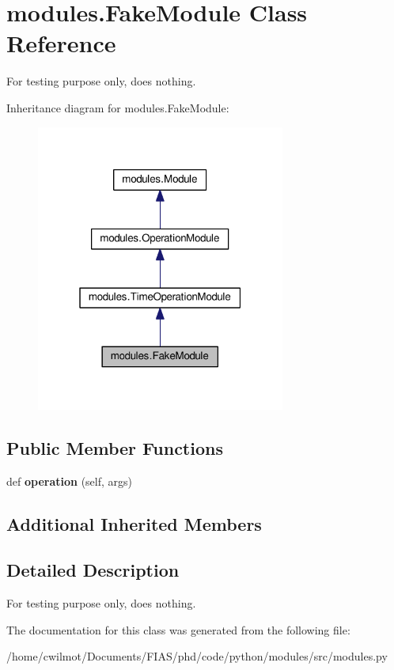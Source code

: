 \hypertarget{classmodules_1_1_fake_module}{}\section{modules.\+Fake\+Module Class Reference}
\label{classmodules_1_1_fake_module}


For testing purpose only, does nothing.  




Inheritance diagram for modules.\+Fake\+Module\+:\nopagebreak
\begin{figure}[H]
\begin{center}
\leavevmode
\includegraphics[width=232pt]{classmodules_1_1_fake_module__inherit__graph}
\end{center}
\end{figure}
\subsection*{Public Member Functions}
\begin{DoxyCompactItemize}
\item 
\mbox{\label{classmodules_1_1_fake_module_a3a458b0dd01068a669f85be3b0a85aa1}} 
def {\bfseries operation} (self, args)
\end{DoxyCompactItemize}
\subsection*{Additional Inherited Members}


\subsection{Detailed Description}
For testing purpose only, does nothing. 

The documentation for this class was generated from the following file\+:\begin{DoxyCompactItemize}
\item 
/home/cwilmot/\+Documents/\+F\+I\+A\+S/phd/code/python/modules/src/modules.\+py\end{DoxyCompactItemize}

